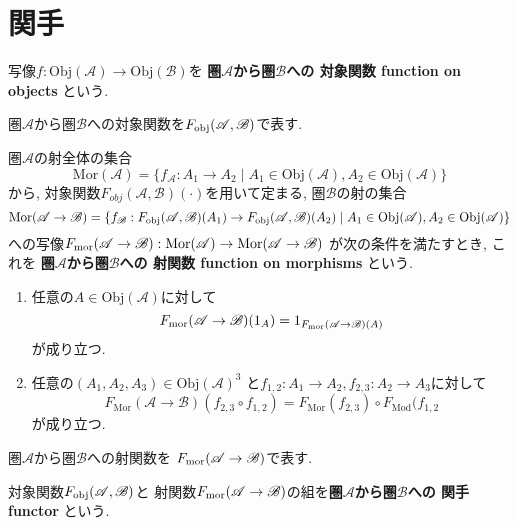 \section{関手}
\begin{Def}
写像$f:\mathrm{Obj}(\mathscr{A})\rightarrow\mathrm{Obj}(\mathscr{B})$を
{\bf 圏$\mathscr{A}$から圏$\mathscr{B}$への
対象関数 function on objects
}という.
\end{Def}
\begin{Notation}
圏$\mathscr{A}$から圏$\mathscr{B}$への対象関数を$F_{\rm obj}(\mathscr{A},\mathscr{B})$で表す.
\end{Notation}
\begin{Def}
圏$\mathscr{A}$の射全体の集合\[\mathrm{Mor}(\mathscr{A})=\{f_{\mathscr{A}}:A_1\rightarrow A_2\mid A_1\in\mathrm{Obj}(\mathscr{A}),A_2\in\mathrm{Obj}(\mathscr{A})\}\]
から, 対象関数$F_{obj}(\mathscr{A},\mathscr{B})(\cdot)$を用いて定まる, 圏$\mathscr{B}$の射の集合
\[
\mathrm{Mor}(\mathscr{A}\rightarrow\mathscr{B})=\{f_{\mathscr{B}}:F_{\rm obj}(\mathscr{A},\mathscr{B})(A_1)\rightarrow
F_{\rm obj}(\mathscr{A},\mathscr{B})(A_2)\mid A_1\in\mathrm{Obj}(\mathscr{A}),A_2\in\mathrm{Obj}(\mathscr{A})\}
\]
への写像$F_{\rm mor}(\mathscr{A}\rightarrow\mathscr{B}):\mathrm{Mor}(\mathscr{A})\rightarrow\mathrm{Mor}(\mathscr{A}\rightarrow\mathscr{B})$
が次の条件を満たすとき, これを
{\bf 圏$\mathscr{A}$から圏$\mathscr{B}$への
射関数 function on morphisms
}という.
\begin{enumerate}
\item 任意の$A\in\mathrm{Obj}(\mathscr{A})$に対して
\[
F_{\rm mor}(\mathscr{A}\rightarrow\mathscr{B})
(1_A)=1_{F_{\rm mor}(\mathscr{A}\rightarrow\mathscr{B})(A)}\]
が成り立つ.
\item 任意の$(A_1,A_2,A_3)\in \mathrm{Obj}(\mathscr{A})^3$
と$f_{1,2}:A_1\rightarrow A_2, f_{2,3}:A_2\rightarrow A_3$に対して
\[
F_{\mathrm{Mor}}(\mathscr{A}\rightarrow\mathscr{B})(f_{2,3}\circ f_{1,2})
=F_{\mathrm{Mor}}(f_{2,3})\circ F_{\mathrm{Mod}}(f_{1,2}
\]
が成り立つ.
\end{enumerate}
\end{Def}
\begin{Notation}
圏$\mathscr{A}$から圏$\mathscr{B}$への射関数を
$F_{\rm mor}(\mathscr{A}\rightarrow\mathscr{B})$で表す.
\end{Notation}
\begin{Def}
対象関数$F_{\rm obj}(\mathscr{A},\mathscr{B})$と
射関数$F_{\rm mor}(\mathscr{A}\rightarrow\mathscr{B})$の組を{\bf 圏$\mathscr{A}$から圏$\mathscr{B}$への
関手 functor
}という.
\end{Def}
